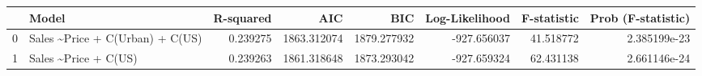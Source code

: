 \begin{tabular}{llrrrrrr}
\toprule
{} &                             Model &  R-squared &          AIC &          BIC &  Log-Likelihood &  F-statistic &  Prob (F-statistic) \\
\midrule
0 &  Sales \textasciitilde  Price + C(Urban) + C(US) &   0.239275 &  1863.312074 &  1879.277932 &     -927.656037 &    41.518772 &        2.385199e-23 \\
1 &             Sales \textasciitilde  Price + C(US) &   0.239263 &  1861.318648 &  1873.293042 &     -927.659324 &    62.431138 &        2.661146e-24 \\
\bottomrule
\end{tabular}
